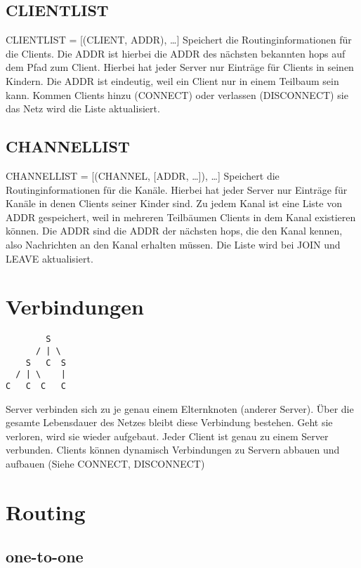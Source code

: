 \documentclass{article}
\begin{document}
\subsection{CLIENTLIST}

CLIENTLIST = [(CLIENT, ADDR), \ldots]
Speichert die Routinginformationen für die Clients. Die ADDR ist hierbei die ADDR des nächsten bekannten hops auf dem Pfad zum Client. Hierbei hat jeder Server nur Einträge für Clients in seinen Kindern. Die ADDR ist eindeutig, weil ein Client nur in einem Teilbaum sein kann. Kommen Clients hinzu (CONNECT) oder verlassen (DISCONNECT) sie das Netz wird die Liste aktualisiert.

\subsection{CHANNELLIST}

CHANNELLIST = [(CHANNEL, [ADDR, \ldots]), \ldots]
Speichert die Routinginformationen für die Kanäle. Hierbei hat jeder Server nur Einträge für Kanäle in denen Clients seiner Kinder sind. Zu jedem Kanal ist eine Liste von ADDR gespeichert, weil in mehreren Teilbäumen Clients in dem Kanal existieren können. Die ADDR sind die ADDR der nächsten hops, die den Kanal kennen, also Nachrichten an den Kanal erhalten müssen. Die Liste wird bei JOIN und LEAVE aktualisiert.


\section{Verbindungen}

\begin{lstlisting}
        S
      / | \
    S   C  S
  / | \    |
C   C  C   C
\end{lstlisting}

Server verbinden sich zu je genau einem Elternknoten (anderer Server). Über die gesamte Lebensdauer des Netzes bleibt diese Verbindung bestehen. Geht sie verloren, wird sie wieder aufgebaut.
Jeder Client ist genau zu einem Server verbunden. Clients können dynamisch Verbindungen zu Servern abbauen und aufbauen (Siehe CONNECT, DISCONNECT)


\section{Routing}

\subsection{one-to-one}
\end{document}
